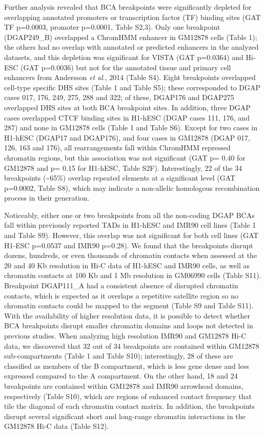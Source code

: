 \documentclass[a4paper,twoside=true,openright,parskip=full,chapterprefix=true,11pt,headings=normal,bibliography=totoc,listof=totoc,titlepage=on,captions=tableabove,draft=false]{scrreprt}
\theoremstyle{definition}
\theoremstyle{definition}
\theoremstyle{definition}
\theoremstyle{remark}
\begin{document}
Further analysis revealed that BCA breakpoints were significantly
depleted for overlapping annotated promoters or transcription factor
(TF) binding sites (GAT TF p=0.0003, promoter p=0.0001, Table S2,3).
Only one breakpoint (DGAP249\_B) overlapped a ChromHMM enhancer in
GM12878 cells (Table 1); the others had no overlap with annotated or
predicted enhancers in the analyzed datasets, and this depletion was
significant for VISTA (GAT p=0.0364) and Hi-ESC (GAT p=0.0036) but not
for the annotated tissue and primary cell enhancers from Andersson
\emph{et al}., 2014\citep{Andersson2014} (Table S4). Eight breakpoints
overlapped cell-type specific DHS sites (Table 1 and Table S5); these
corresponded to DGAP cases 017, 176, 249, 275, 288 and 322; of these,
DGAP176 and DGAP275 overlapped DHS sites at both BCA breakpoint sites.
In addition, three DGAP cases overlapped CTCF binding sites in H1-hESC
(DGAP cases 111, 176, and 287) and none in GM12878 cells (Table 1 and
Table S6). Except for two cases in H1-hESC (DGAP17 and DGAP176), and
four cases in GM12878 (DGAP 017, 126, 163 and 176), all rearrangements
fall within ChromHMM repressed chromatin regions, but this association
was not significant (GAT p= 0.40 for GM12878 and p= 0.15 for H1-hESC,
Table S2F). Interestingly, 22 of the 34 breakpoints
(\textasciitilde{}65\%) overlap repeated elements at a significant level
(GAT p=0.0002, Table S8), which may indicate a non-allelic homologous
recombination process in their generation.\citep{Gu2008, Cardoso2016}

Noticeably, either one or two breakpoints from all the non-coding DGAP
BCAs fall within previously reported TADs in H1-hESC and IMR90 cell
lines (Table 1 and Table S9).\citep{Dixon2012} However, this overlap was
not significant for both cell lines (GAT H1-ESC p=0.0537 and IMR90
p=0.28). We found that the breakpoints disrupt dozens, hundreds, or even
thousands of chromatin contacts when assessed at the 20 and 40 Kb
resolution in Hi-C data of H1-hESC and IMR90 cells, as well as chromatin
contacts at 100 Kb and 1 Mb resolution in GM06990 cells (Table S11).
Breakpoint DGAP111\_A had a consistent absence of disrupted chromatin
contacts, which is expected as it overlaps a repetitive satellite region
so no chromatin contacts could be mapped to the segment (Table S9 and
Table S11). With the availability of higher resolution data, it is
possible to detect whether BCA breakpoints disrupt smaller chromatin
domains and loops not detected in previous studies. When analyzing high
resolution IMR90 and GM12878 Hi-C data,\citep{Rao2014} we discovered
that 32 out of 34 breakpoints are contained within GM12878
sub-compartments (Table 1 and Table S10); interestingly, 28 of these are
classified as members of the B compartment, which is less gene dense and
less expressed compared to the A compartment. On the other hand, 18 and
24 breakpoints are contained within GM12878 and IMR90 arrowhead domains,
respectively (Table S10), which are regions of enhanced contact
frequency that tile the diagonal of each chromatin contact matrix. In
addition, the breakpoints disrupt several significant short and
long-range chromatin interactions in the GM12878 Hi-C data (Table S12).
\end{document}
